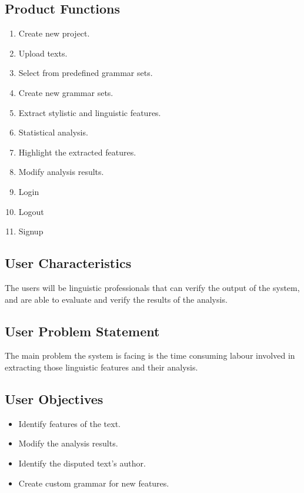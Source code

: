 \documentclass[12pt]{article}
\begin{document}
\subsection{Product Functions}
\begin{enumerate}
    \item Create new project.
    \item Upload texts.
    \item Select from predefined grammar sets.
    \item Create new grammar sets.
    \item Extract stylistic and linguistic features.
    \item Statistical analysis.
    \item Highlight the extracted features.
    \item Modify analysis results.
    \item Login
    \item Logout
    \item Signup
\end{enumerate}
\subsection{User Characteristics}
The users will be linguistic professionals that can verify the output of the system, and are able to evaluate and verify the results of the analysis.
\subsection{User Problem Statement}
The main problem the system is facing is the time consuming labour involved in extracting those linguistic features and their analysis.
\subsection{User Objectives}
\begin{itemize}
    \item Identify features of the text.
    \item Modify the analysis results.
    \item Identify the disputed text's author.
    \item Create custom grammar for new features.
\end{itemize}
\end{document}
